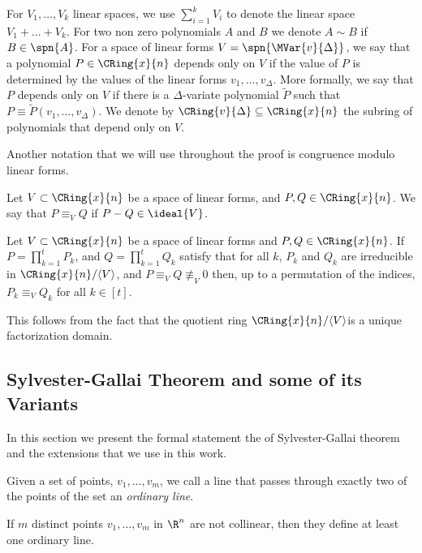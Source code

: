 For $V_1,\ldots,V_k$ linear spaces, we use $\sum_{i=1}^k V_i$ to denote the linear space $V_1 + \ldots + V_k$. For two non zero polynomials $A$ and $B$ we denote $A\sim B$ if $B \in \spn{A}$. For a space of linear forms $V = \spn{\MVar{v}{\Delta}}$, we say that a polynomial $P \in \CRing{x}{n}$ depends only on $V$  if the value of $P$ is determined by the values of the linear forms $v_1,\ldots,v_\Delta$. More formally, we say that $P$ depends only on $V$ if there is a $\Delta$-variate polynomial $\tilde{P}$ such that $P \equiv \tilde{P}(v_1,\ldots,v_\Delta)$. We denote by  $\CRing{v}{\Delta}\subseteq \CRing{x}{n}$ the subring of polynomials that depend only on $V$.


Another notation that we will use throughout the proof is congruence modulo linear forms.
\begin{definition}\label{def:mod-form}
Let $V\subset \CRing{x}{n}$ be a space of linear forms, and $P,Q\in \CRing{x}{n}$. We say that $P\equiv_V Q$ if $P-Q \in \ideal{V}$. 
\end{definition}

\begin{fact}\label{fact:ufd}
Let $V\subset \CRing{x}{n}$ be a space of linear forms and $P,Q\in \CRing{x}{n}$. If $P = \prod_{k=1}^t P_k$, and $Q = \prod_{k=1}^t Q_k$ satisfy that for all $k$, $P_k$ and $Q_k$ are irreducible in $\CRing{x}{n}/{\langle V\rangle}$, and $P \equiv_V Q \not\equiv_V 0$ then, up to a permutation of the indices, $P_k\equiv_V Q_k$ for all $k\in [t]$.
\end{fact}
This follows from the fact that the quotient ring $\CRing{x}{n}/{\langle V\rangle}$is a unique factorization domain.


\subsection{Sylvester-Gallai Theorem and some of its Variants}\label{sec:SGThms}
In this section we present the formal statement the of Sylvester-Gallai theorem and the extensions that we use in this work.

\begin{definition}
Given a set of points, $v_1,\ldots ,v_m$, we call a line that passes through exactly two of the
points of the set an \emph{ordinary line}.
\end{definition}


\begin{theorem}\label{thm:SG}
If $m$ distinct points $v_1,\ldots ,v_m$ in $\R^n$ are not collinear, then they define at least one ordinary line.
\end{theorem}

